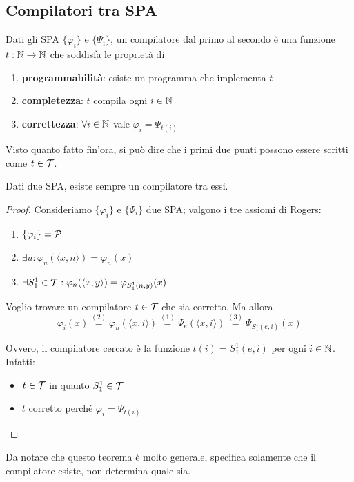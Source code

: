 \subsection{Compilatori tra SPA}

Dati gli SPA $\{\varphi_i\}$ e $\{\Psi_i\}$, un compilatore dal primo al secondo è una funzione $t : \mathbb{N} \rightarrow \mathbb{N}$ che soddisfa le proprietà di
\begin{enumerate}
	\item \textbf{programmabilità}: esiste un programma che implementa $t$
	\item \textbf{completezza}: $t$ compila ogni $i \in \mathbb{N}$
	\item \textbf{correttezza}: $\forall i \in \mathbb{N}$ vale $\varphi_i = \Psi_{t(i)}$
\end{enumerate}

Visto quanto fatto fin'ora, si può dire che i primi due punti possono essere scritti come $t \in \mathcal{T}$.\\

\begin{theor}
	Dati due SPA, esiste sempre un compilatore tra essi.
\end{theor}
\begin{proof}
	Consideriamo $\{\varphi_i\}$ e $\{\Psi_i\}$ due SPA; valgono i tre assiomi di Rogers:
	\begin{enumerate}
		\item $\{\varphi_i\} = \mathcal{P}$
		\item $\exists u: \varphi_u (\langle x,n \rangle) = \varphi_n (x)$
		\item $\exists S_1^1 \in \mathcal{T}: \varphi_n (\langle x,y \rangle ) = \varphi_{S^1_1 (n,y)} (x)$
	\end{enumerate}

	Voglio trovare un compilatore $t \in \mathcal{T}$ che sia corretto. Ma allora
	$$ \varphi_i (x) \stackrel{(2)}{=} \varphi_u (\langle x,i \rangle ) \stackrel{(1)}{=} \Psi_e (\langle x,i \rangle) \stackrel{(3)}{=} \Psi_{S_1^1(e,i)} (x) $$

	Ovvero, il compilatore cercato è la funzione $t(i) = S^1_1 (e,i)$ per ogni $i \in \mathbb{N}$. Infatti:
	\begin{itemize}
		\item $t \in \mathcal{T}$ in quanto $S_1^1 \in \mathcal{T}$
		\item $t$ corretto perché $\varphi_i = \Psi_{t(i)}$
	\end{itemize}
\end{proof}

Da notare che questo teorema è molto generale, specifica solamente che il compilatore esiste, non determina quale sia. \\

